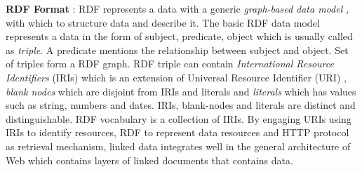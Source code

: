 \noindent \textbf{RDF Format} : RDF represents a data with a generic \textit{graph-based data model} \cite{linkeddatasofar}, with which to structure data and describe it. The basic RDF data model represents a data in the form of subject, predicate, object which is usually called as \textit{triple}. A predicate mentions the relationship between subject and object. Set of triples form a RDF graph. RDF triple can contain\textit{ International Resource Identifiers} (IRIs) which is an extension of Universal Resource Identifier (URI) , \textit{blank nodes} which are disjoint from IRIs and literals  and \textit{literals} which has values such as string, numbers and dates. IRIs, blank-nodes and literals are distinct and distinguishable.  RDF vocabulary is a collection of IRIs. By engaging URIs using IRIs to identify resources, RDF to represent data resources and HTTP protocol as retrieval mechanism, linked data integrates well in the general architecture of Web which contains layers of linked documents that contains data. 

